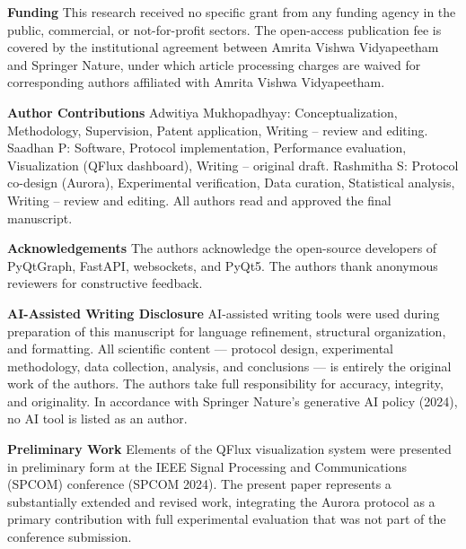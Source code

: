 {{{{{{\textbf{Funding  }This research received no specific grant from any funding agency in the public, commercial, or not-for-profit sectors. The open-access publication fee is covered by the institutional agreement between Amrita Vishwa Vidyapeetham and Springer Nature, under which article processing charges are waived for corresponding authors affiliated with Amrita Vishwa Vidyapeetham.

\textbf{Author Contributions  }Adwitiya Mukhopadhyay: Conceptualization, Methodology, Supervision, Patent application, Writing – review and editing. Saadhan P: Software, Protocol implementation, Performance evaluation, Visualization (QFlux dashboard), Writing – original draft. Rashmitha S: Protocol co-design (Aurora), Experimental verification, Data curation, Statistical analysis, Writing – review and editing. All authors read and approved the final manuscript.

\textbf{Acknowledgements  }The authors acknowledge the open-source developers of PyQtGraph, FastAPI, websockets, and PyQt5. The authors thank anonymous reviewers for constructive feedback.

\textbf{AI-Assisted Writing Disclosure  }AI-assisted writing tools were used during preparation of this manuscript for language refinement, structural organization, and formatting. All scientific content — protocol design, experimental methodology, data collection, analysis, and conclusions — is entirely the original work of the authors. The authors take full responsibility for accuracy, integrity, and originality. In accordance with Springer Nature's generative AI policy (2024), no AI tool is listed as an author.

\textbf{Preliminary Work  }Elements of the QFlux visualization system were presented in preliminary form at the IEEE Signal Processing and Communications (SPCOM) conference (SPCOM 2024). The present paper represents a substantially extended and revised work, integrating the Aurora protocol as a primary contribution with full experimental evaluation that was not part of the conference submission.

}}}}}}
